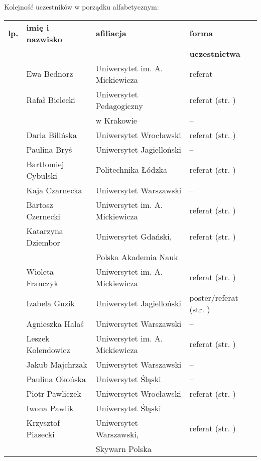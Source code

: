 \documentclass[12pt,oneside]{book}
\begin{document}
Kolejność uczestników w porządku alfabetycznym:


\normalsize
\begin{tabular}{||c|l|l|l||}
\hline
\hline
\textbf{lp.} & \textbf{imię i nazwisko} & \textbf{afiliacja} & \textbf{forma}\\
 &  &  & \textbf{uczestnictwa}\\
\hline
\hline
\hline
	 & Ewa Bednorz & Uniwersytet im. A. Mickiewicza & referat \\\hline
	 & Rafał Bielecki & Uniwersytet Pedagogiczny & referat (str. \pageref{bielecki})\\
	 &  & w Krakowie & -- \\\hline
	 & Daria Bilińska & Uniwersytet Wrocławski & referat (str. \pageref{bilinska}) \\\hline
	 & Paulina Bryś & Uniwersytet Jagielloński & -- \\\hline
	 & Bartłomiej Cybulski & Politechnika Łódzka & referat (str. \pageref{cybulski}) \\\hline
	 & Kaja Czarnecka & Uniwersytet Warszawski & -- \\\hline
	 & Bartosz Czernecki & Uniwersytet im. A. Mickiewicza & referat (str. \pageref{kolendowicz}) \\\hline
 	 & Katarzyna Dziembor & Uniwersytet Gdański, & referat (str. \pageref{dziembor})\\
		 &  & Polska Akademia Nauk &  \\\hline
 	 & Wioleta Franczyk & Uniwersytet im. A. Mickiewicza & referat  (str. \pageref{franczyk})\\\hline
 	 & Izabela Guzik & Uniwersytet Jagielloński & poster/referat (str. \pageref{guzik})\\\hline	
 	 & Agnieszka Halaś & Uniwersytet Warszawski & -- \\\hline	
 	 & Leszek Kolendowicz & Uniwersytet im. A. Mickiewicza & referat (str. \pageref{kolendowicz}) \\\hline
 	 & Jakub Majchrzak & Uniwersytet Warszawski & -- \\\hline	
	 & Paulina Okońska & Uniwersytet Śląski & -- \\\hline
 	 & Piotr Pawliczek & Uniwersytet Wrocławski & referat (str. \pageref{pawliczek})\\\hline
 	 & Iwona Pawlik & Uniwersytet Śląski & -- \\\hline
 	 & Krzysztof Piasecki & Uniwersytet Warszawski, & referat (str. \pageref{piasecki})\\
		 &  & Skywarn Polska &  \\\hline

\end{tabular}
\end{document}
